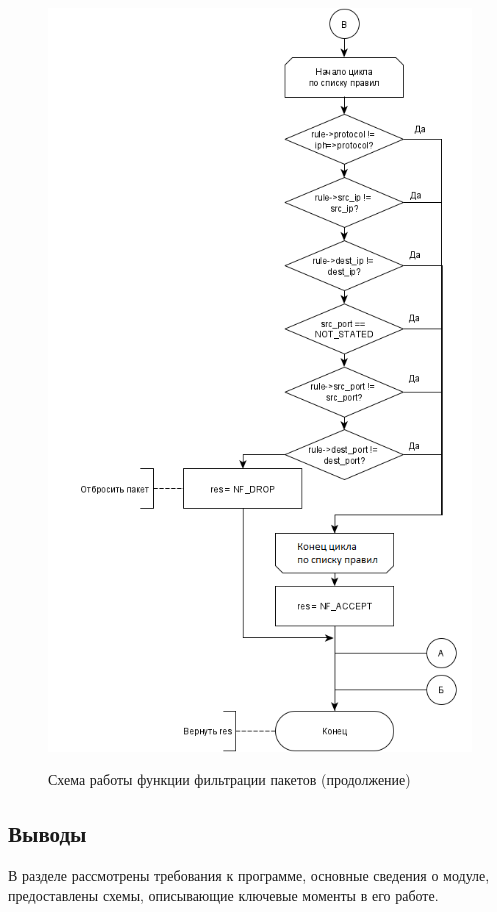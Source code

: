 \begin{figure}[h!]
	\begin{center}
		{\includegraphics[scale = 0.75]{img/filter2.png}}
		\caption{Схема работы функции фильтрации пакетов (продолжение)}
		\label{fig10:image}
	\end{center}
\end{figure}

\subsection{Выводы}
В разделе рассмотрены требования к программе, основные сведения о модуле, предоставлены схемы, описывающие ключевые моменты в его работе.
